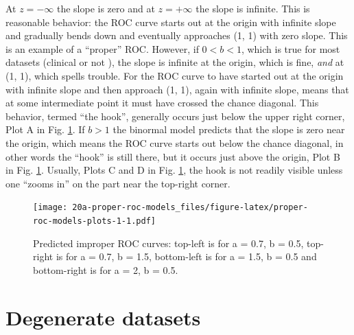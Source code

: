 \documentclass[
]{book}
\begin{document}
At \(z=-\infty\) the slope is zero and at \(z=+\infty\) the slope is infinite. This is reasonable behavior: the ROC curve starts out at the origin with infinite slope and gradually bends down and eventually approaches (1, 1) with zero slope. This is an example of a ``proper'' ROC. However, if \(0 < b < 1\), which is true for most datasets (clinical or not \citep{green1966signal}), the slope is infinite at the origin, which is fine, \emph{and} at (1, 1), which spells trouble. For the ROC curve to have started out at the origin with infinite slope and then approach (1, 1), again with infinite slope, means that at some intermediate point it must have crossed the chance diagonal. This behavior, termed ``the hook'', generally occurs just below the upper right corner, Plot A in Fig. \ref{fig:proper-roc-models-plots-1}. If \(b > 1\) the binormal model predicts that the slope is zero near the origin, which means the ROC curve starts out below the chance diagonal, in other words the ``hook'' is still there, but it occurs just above the origin, Plot B in Fig. \ref{fig:proper-roc-models-plots-1}. Usually, Plots C and D in Fig. \ref{fig:proper-roc-models-plots-1}, the hook is not readily visible unless one ``zooms in'' on the part near the top-right corner.

\begin{figure}
\centering
\texttt{[image: 20a-proper-roc-models\_files/figure-latex/proper-roc-models-plots-1-1.pdf]}
\caption{\label{fig:proper-roc-models-plots-1}Predicted improper ROC curves: top-left is for a = 0.7, b = 0.5, top-right is for a = 0.7, b = 1.5, bottom-left is for a = 1.5, b = 0.5 and bottom-right is for a = 2, b = 0.5.}
\end{figure}

\hypertarget{proper-roc-models-degenerate-datasets}{%
\section{Degenerate datasets}\label{proper-roc-models-degenerate-datasets}}
\end{document}
